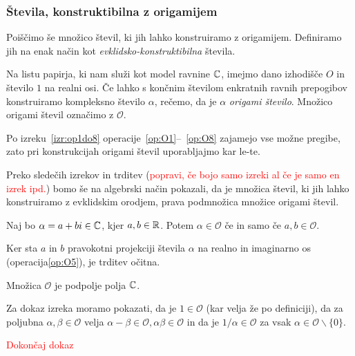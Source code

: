 \subsubsection{Števila, konstruktibilna z origamijem}
\label{origami_konstruktibilnost}

Poiščimo še množico števil, ki jih lahko konstruiramo z origamijem. Definiramo jih na enak način kot \emph{evklidsko-konstruktibilna} števila.

\begin{definicija}
    Na listu papirja, ki nam služi kot model ravnine $\mathbb C$, imejmo dano izhodišče $O$ in število $1$ na realni osi. Če lahko s končnim številom enkratnih ravnih prepogibov konstruiramo kompleksno število $\alpha$, rečemo, da je $\alpha$ \emph{origami število}. Množico origami števil označimo z $\mathcal{O}$.
\end{definicija}

\begin{opomba}
    Po izreku~\ref{izr:op1do8} operacije~\ref{op:O1}--~\ref{op:O8} zajamejo vse možne pregibe, zato pri konstrukcijah origami števil uporabljajmo kar le-te.
\end{opomba}

Preko sledečih izrekov in trditev (\textcolor{red}{popravi, če bojo samo izreki al če je samo en izrek ipd.}) bomo še na algebrski način pokazali, da je množica števil, ki jih lahko konstruiramo z evklidskim orodjem, prava podmnožica množice origami števil.

\begin{trditev}
    Naj bo $\alpha = a + bi \in \mathbb C$, kjer $a, b \in \mathbb R$. Potem $\alpha \in \mathcal{O}$ če in samo če $a, b \in \mathcal{O}$.
\end{trditev}
\begin{dokaz}
    Ker sta $a$ in $b$ pravokotni projekciji števila $\alpha$ na realno in imaginarno os (operacija\ref{op:O5}), je trditev očitna.
\end{dokaz}

\begin{izrek}
    \label{izr:podpolje}
    Množica $\mathcal{O}$ je podpolje polja $\mathbb C$.
\end{izrek}

\begin{dokaz}
    Za dokaz izreka moramo pokazati, da je $1 \in \mathcal{O}$ (kar velja že po definiciji), da za poljubna $\alpha, \beta \in \mathcal{O}$ velja $\alpha - \beta \in \mathcal{O}, \alpha\beta \in \mathcal{O}$ in da je $1/\alpha \in \mathcal{O}$ za vsak $\alpha \in \mathcal{O} \backslash \{0\}$.

    \textcolor{red}{Dokončaj dokaz}
\end{dokaz}

